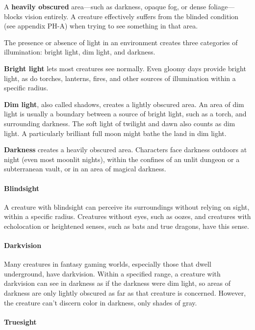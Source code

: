 \documentclass[
]{article}
\begin{document}
A \textbf{heavily obscured} area---such as darkness, opaque fog, or
dense foliage---blocks vision entirely. A creature effectively suffers
from the blinded condition (see appendix PH-A) when trying to see
something in that area.

The presence or absence of light in an environment creates three
categories of illumination: bright light, dim light, and darkness.

\textbf{Bright light} lets most creatures see normally. Even gloomy days
provide bright light, as do torches, lanterns, fires, and other sources
of illumination within a specific radius.

\textbf{Dim light}, also called shadows, creates a lightly obscured
area. An area of dim light is usually a boundary between a source of
bright light, such as a torch, and surrounding darkness. The soft light
of twilight and dawn also counts as dim light. A particularly brilliant
full moon might bathe the land in dim light.

\textbf{Darkness} creates a heavily obscured area. Characters face
darkness outdoors at night (even most moonlit nights), within the
confines of an unlit dungeon or a subterranean vault, or in an area of
magical darkness.

\hypertarget{blindsight}{%
\paragraph{Blindsight}\label{blindsight}}

A creature with blindsight can perceive its surroundings without relying
on sight, within a specific radius. Creatures without eyes, such as
oozes, and creatures with echolocation or heightened senses, such as
bats and true dragons, have this sense.

\hypertarget{darkvision}{%
\paragraph{Darkvision}\label{darkvision}}

Many creatures in fantasy gaming worlds, especially those that dwell
underground, have darkvision. Within a specified range, a creature with
darkvision can see in darkness as if the darkness were dim light, so
areas of darkness are only lightly obscured as far as that creature is
concerned. However, the creature can't discern color in darkness, only
shades of gray.

\hypertarget{truesight}{%
\paragraph{Truesight}\label{truesight}}
\end{document}
